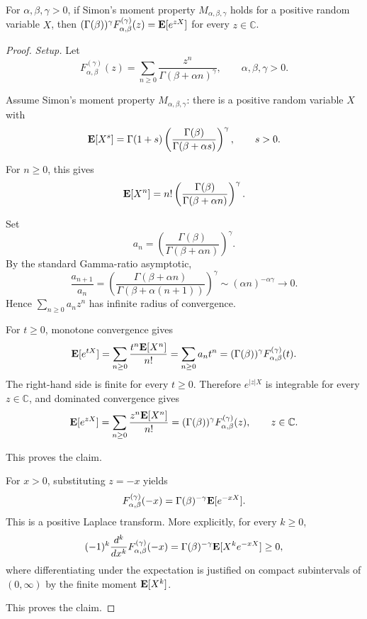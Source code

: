 \begin{proposition}
\label{res:simon-leroy-moment-property-normal-form}
For \(\alpha,\beta,\gamma>0\), if Simon's moment property \(M_{\alpha,\beta,\gamma}\) holds for a positive random variable \(X\), then \((\Gamma(\beta))^\gamma F^{(\gamma)}_{\alpha,\beta}(z)={\bf E}[e^{zX}]\) for every \(z\in\mathbb C\).
\end{proposition}
\begin{proof}
\emph{Setup.}
Let
\[
F^{(\gamma)}_{\alpha,\beta}(z)
=\sum_{n\ge0}\frac{z^n}{\Gamma(\beta+\alpha n)^\gamma},
\qquad \alpha,\beta,\gamma>0.
\]

Assume Simon's moment property \(M_{\alpha,\beta,\gamma}\): there is a positive random variable \(X\) with
\[
{\bf E}[X^s]
=\Gamma(1+s)\left(\frac{\Gamma(\beta)}{\Gamma(\beta+\alpha s)}\right)^\gamma,
\qquad s>0.
\]

For \(n\ge0\), this gives
\[
{\bf E}[X^n]
=n!\left(\frac{\Gamma(\beta)}{\Gamma(\beta+\alpha n)}\right)^\gamma.
\]

Set
\[
a_n=\left(\frac{\Gamma(\beta)}{\Gamma(\beta+\alpha n)}\right)^\gamma.
\]
By the standard Gamma-ratio asymptotic,
\[
\frac{a_{n+1}}{a_n}
=\left(\frac{\Gamma(\beta+\alpha n)}{\Gamma(\beta+\alpha(n+1))}\right)^\gamma
\sim (\alpha n)^{-\alpha\gamma}\to0.
\]
Hence \(\sum_{n\ge0}a_n z^n\) has infinite radius of convergence.

For \(t\ge0\), monotone convergence gives
\[
{\bf E}[e^{tX}]
=\sum_{n\ge0}\frac{t^n{\bf E}[X^n]}{n!}
=\sum_{n\ge0}a_n t^n
=(\Gamma(\beta))^\gamma F^{(\gamma)}_{\alpha,\beta}(t).
\]
The right-hand side is finite for every \(t\ge0\). Therefore \(e^{|z|X}\) is integrable for every \(z\in\mathbb C\), and dominated convergence gives
\[
{\bf E}[e^{zX}]
=\sum_{n\ge0}\frac{z^n{\bf E}[X^n]}{n!}
=(\Gamma(\beta))^\gamma F^{(\gamma)}_{\alpha,\beta}(z),
\qquad z\in\mathbb C.
\]

This proves the claim.

For \(x>0\), substituting \(z=-x\) yields
\[
F^{(\gamma)}_{\alpha,\beta}(-x)
=\Gamma(\beta)^{-\gamma}{\bf E}[e^{-xX}].
\]
This is a positive Laplace transform. More explicitly, for every \(k\ge0\),
\[
(-1)^k\frac{d^k}{dx^k}F^{(\gamma)}_{\alpha,\beta}(-x)
=\Gamma(\beta)^{-\gamma}{\bf E}[X^k e^{-xX}]\ge0,
\]
where differentiating under the expectation is justified on compact subintervals of \((0,\infty)\) by the finite moment \({\bf E}[X^k]\).

This proves the claim.
\end{proof}

